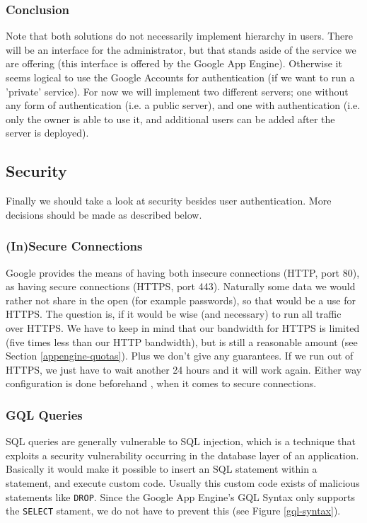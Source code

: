 \subsubsection{Conclusion}
Note that both solutions do not necessarily implement hierarchy in users. There
will be an interface for the administrator, but that stands aside of the service
we are offering (this interface is offered by the Google App Engine). Otherwise
it seems logical to use the Google Accounts for authentication (if we want to run
a 'private' service). For now we will implement two different servers; one
without any form of authentication (i.e. a public server), and one with
authentication (i.e. only the owner is able to use it, and additional users can
be added after the server is deployed).

\subsection{Security}
\label{server-design-security}
Finally we should take a look at security besides user authentication. More
decisions should be made as described below.

\subsubsection{(In)Secure Connections}
Google provides the means of having both insecure connections (HTTP, port 80), as
having secure connections (HTTPS, port 443). Naturally some data we would rather
not share in the open (for example passwords), so that would be a use for HTTPS.
The question is, if it would be wise (and necessary) to run all traffic over
HTTPS. We have to keep in mind that our bandwidth for HTTPS is limited (five
times less than our HTTP bandwidth), but is still a reasonable amount (see
Section \ref{appengine-quotas}). Plus we don't give any guarantees. If we run
out of HTTPS, we just have to wait another 24 hours and it will work again. Either way
configuration is done beforehand , when it comes to secure connections.

\subsubsection{GQL Queries}
SQL queries are generally vulnerable to SQL injection,
which is a technique that exploits a security vulnerability occurring in the
database layer of an application. Basically it would make it possible to insert
an SQL statement within a statement, and execute custom code. Usually this
custom code exists of malicious statements like \texttt{DROP}. Since the Google
App Engine's GQL Syntax only supports the \texttt{SELECT} stament, we do not
have to prevent this (see Figure \ref{gql-syntax}).

